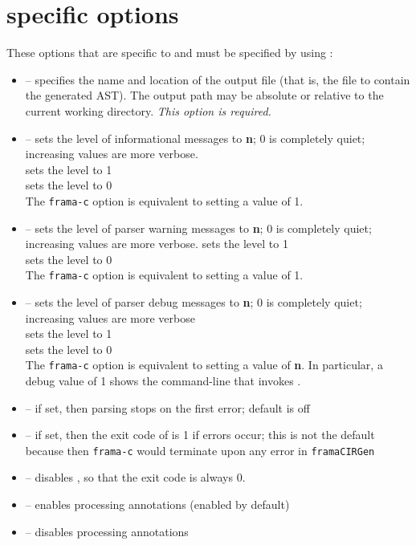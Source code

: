 \section{\irg specific options}
\label{sec:fcloptions}

These options that are specific to \irg and must be specified by using :
\begin{itemize}
	\item {} -- specifies the name and location of the output file (that is, the file to contain the generated AST). The output path may be absolute or relative to the current working directory. \textit{This option is required.}
	\item {} -- sets the level of informational messages to \textbf{n}; 0 is completely quiet; increasing values are
	more verbose. \\
	 sets the level to 1 \\
	 sets the level to 0\\
	 The \lstinline|frama-c| option  is equivalent to setting a value of 1.
	
	\item {} -- sets the level of parser warning messages to \textbf{n}; 0 is completely quiet; increasing values are
more verbose.  sets the level to 1\\
 sets the level to 0\\
The \lstinline|frama-c| option  is equivalent to setting a value of 1.

	\item {} -- sets the level of parser debug messages to \textbf{n}; 0 is completely quiet; increasing values are
more verbose\\
  sets the level to 1\\
 sets the level to 0\\
The \lstinline|frama-c| option  is equivalent to setting a value of \textbf{n}.
In particular, a debug value of 1 shows the command-line that invokes \irg.

	\item {} -- if set, then parsing stops on the first error; default is off
	\item {} -- if set, then the exit code of \irg is 1 if errors occur; this is not the default because then \lstinline|frama-c| would terminate upon
	any error in \lstinline|framaCIRGen|
	\item {} -- disables , so that the exit code is always 0.

	\item {} -- enables processing \NAME annotations (enabled by default)
	\item {} -- disables processing \NAME annotations
	
\end{itemize}

